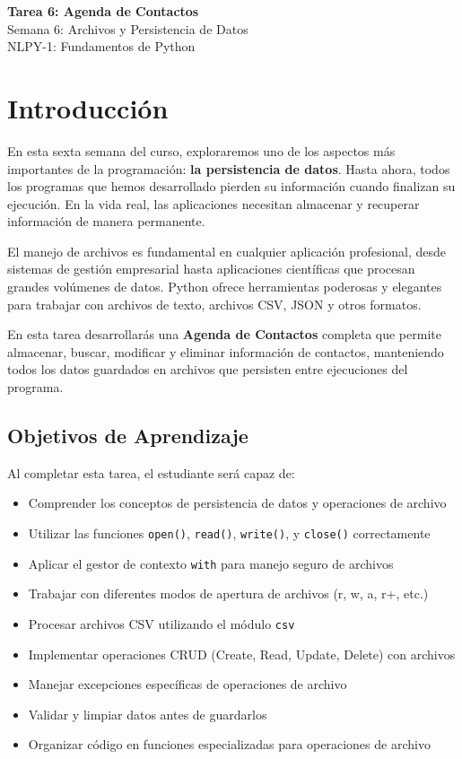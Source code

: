 \documentclass[11pt,letterpaper]{article}
\begin{document}
\begin{center}
    {\LARGE \textbf{Tarea 6: Agenda de Contactos}}\\[0.3cm]
    {\Large Semana 6: Archivos y Persistencia de Datos}\\[0.2cm]
    {\large NLPY-1: Fundamentos de Python}\\[0.2cm]
\end{center}

\section{Introducción}

En esta sexta semana del curso, exploraremos uno de los aspectos más importantes de la programación: \textbf{la persistencia de datos}. Hasta ahora, todos los programas que hemos desarrollado pierden su información cuando finalizan su ejecución. En la vida real, las aplicaciones necesitan almacenar y recuperar información de manera permanente.

El manejo de archivos es fundamental en cualquier aplicación profesional, desde sistemas de gestión empresarial hasta aplicaciones científicas que procesan grandes volúmenes de datos. Python ofrece herramientas poderosas y elegantes para trabajar con archivos de texto, archivos CSV, JSON y otros formatos.

En esta tarea desarrollarás una \textbf{Agenda de Contactos} completa que permite almacenar, buscar, modificar y eliminar información de contactos, manteniendo todos los datos guardados en archivos que persisten entre ejecuciones del programa.

\subsection{Objetivos de Aprendizaje}

Al completar esta tarea, el estudiante será capaz de:

\begin{itemize}
    \item Comprender los conceptos de persistencia de datos y operaciones de archivo
    \item Utilizar las funciones \texttt{open()}, \texttt{read()}, \texttt{write()}, y \texttt{close()} correctamente
    \item Aplicar el gestor de contexto \texttt{with} para manejo seguro de archivos
    \item Trabajar con diferentes modos de apertura de archivos (r, w, a, r+, etc.)
    \item Procesar archivos CSV utilizando el módulo \texttt{csv}
    \item Implementar operaciones CRUD (Create, Read, Update, Delete) con archivos
    \item Manejar excepciones específicas de operaciones de archivo
    \item Validar y limpiar datos antes de guardarlos
    \item Organizar código en funciones especializadas para operaciones de archivo
\end{itemize}
\end{document}
